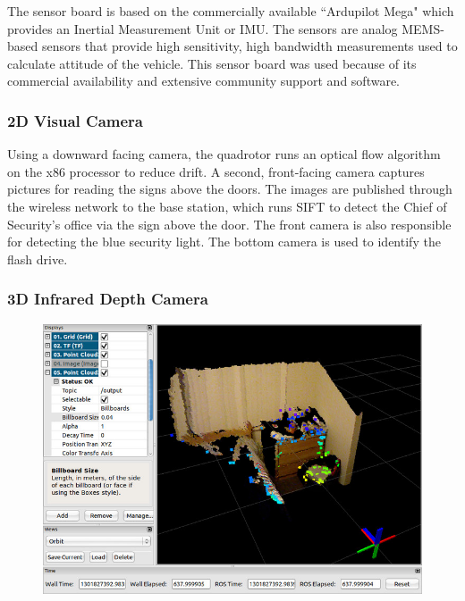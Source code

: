 \documentclass[12pt, letterpaper]{article}
\begin{document}
The sensor board is based on the commercially available ``Ardupilot Mega" which provides an Inertial Measurement Unit or IMU. The sensors are analog MEMS-based sensors that provide high sensitivity, high bandwidth measurements used to calculate attitude of the vehicle. This sensor board was used because of its commercial availability and extensive community support and software.

\subsubsection{2D Visual Camera}

Using a downward facing camera, the quadrotor runs an optical flow algorithm on the x86 processor to reduce drift.  A second, front-facing camera captures pictures for reading the signs above the doors.  The images are published through the wireless network to the base station, which runs SIFT to detect the Chief of Security's office via the sign above the door. The front camera is also responsible for detecting the blue security light.  The bottom camera is used to identify the flash drive.

\subsubsection{3D Infrared Depth Camera}

\begin{figure}[h]
\centering
\includegraphics[width=14cm]{images/point-cloud.jpg}
\label{fig:point-cloud}
\end{figure}
\end{document}
